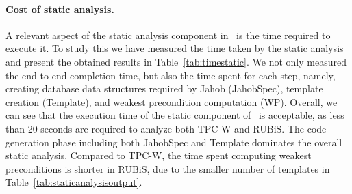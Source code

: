\paragraph{Cost of static analysis.} A relevant aspect of the static analysis component
in \tool\ is the time required to execute it. To study this we have measured the time
taken by the static analysis and present the obtained results in Table~\ref{tab:timestatic}.
We not only measured the end-to-end completion time, but also the time
spent for each step, namely, creating database data structures required by Jahob (JahobSpec), 
template creation (Template), and weakest precondition computation (WP). 
Overall, we can see that the execution time
of the static component of \tool\ is acceptable, as less than
20 seconds are required to analyze both TPC-W and RUBiS. 
The code generation phase including both JahobSpec and Template dominates
the overall static analysis. Compared to TPC-W, the time spent
computing weakest preconditions is shorter in RUBiS, due to
the smaller number of templates in Table~\ref{tab:staticanalysisoutput}.



